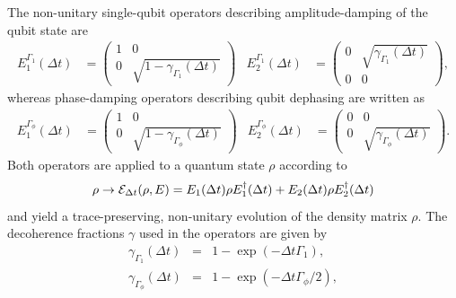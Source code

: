 The non-unitary single-qubit operators describing amplitude-damping of the qubit state are \citep{nielsen_quantum_2000}
%
\begin{align}
 E_1^{\Gamma_1}(\Delta t) & = \left(\begin{array}{cc} 1 & 0 \\ 0 & \sqrt{1-\gamma_{\Gamma_1}(\Delta t)} \end{array}\right)   &  E_2^{\Gamma_1}(\Delta t)  & = \left( \begin{array}{cc} 0 & \sqrt{\gamma_{\Gamma_1}(\Delta t)} \\ 0 & 0 \end{array} \right), \label{eq:grover_energy_relaxation}
\end{align}
%
whereas phase-damping operators describing qubit dephasing are written as
%
\begin{align}
 E_1^{\Gamma_\phi}(\Delta t) & = \left(\begin{array}{cc} 1 & 0 \\ 0 & \sqrt{1-\gamma_{\Gamma_\phi}(\Delta t)} \end{array}\right)   &  E_2^{\Gamma_\phi}(\Delta t)  & = \left( \begin{array}{cc} 0 & 0 \\ 0 & \sqrt{\gamma_{\Gamma_\phi}(\Delta t)}  \end{array} \right). \label{eq:grover_phase_decoherence}
\end{align}
%
Both operators are applied to a quantum state $\rho$ according to
%
\begin{equation}
\rho \to \Er_{\Delta t}(\rho,E) = E_1(\Delta t)\rho E_1^\dagger(\Delta t)+E_2(\Delta t) \rho E_2^\dagger(\Delta t)
\end{equation}
%
and yield a trace-preserving, non-unitary evolution of the density matrix $\rho$. The decoherence fractions $\gamma$ used in the operators are given by
%
\begin{eqnarray}
\gamma_{\Gamma_{1}}(\Delta t) & =  & 1-\exp{\left(-\Delta t \Gamma_1\right)}, \label{eq:effective_relaxation_rate} \\
\gamma_{\Gamma_\phi}(\Delta t) & = & 1-\exp{\left(-\Delta t \Gamma_\phi/2\right)}, \label{eq:effective_dephasing_rate}
\end{eqnarray}
%
